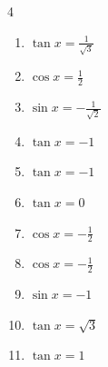 \begin{multicols}{4}
\begin{enumerate}

  \item $\displaystyle \tan{x}  = \frac{1}{\sqrt{3}}$


  \item $\displaystyle \cos{x}  = \frac{1}{2}$


  \item $\displaystyle \sin{x}  = -\frac{1}{\sqrt{2}}$


  \item $\displaystyle \tan{x}  = -1$


  \item $\displaystyle \tan{x}  = -1$


\columnbreak %

  \item $\displaystyle \tan{x}  = 0$

        \phantom{$\displaystyle x = 0 , \pi$}

  \item $\displaystyle \cos{x}  = -\frac{1}{2}$


  \item $\displaystyle \cos{x}  = -\frac{1}{2}$


  \item $\displaystyle \sin{x}  = -1$


  \item $\displaystyle \tan{x}  = \sqrt{3}$


  \item $\displaystyle \tan{x}  = 1$


\end{enumerate}
\end{multicols}

